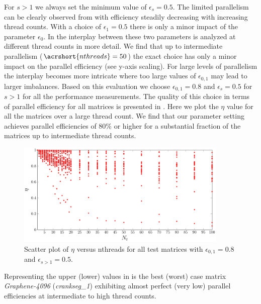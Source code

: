 %
For $s > 1$ we always set the minimum value of $\epsilon_s=0.5$. The limited parallelism can be clearly observed from   with efficiency steadily decreasing with increasing thread counts. With a choice of $\epsilon_1=0.5$ there is only a minor impact of the parameter $\epsilon_0$. In  the interplay between these two parameters is analyzed at different thread counts in more detail. We find that up to intermediate parallelism ($\acrshort{nthreads}=50$) the exact choice has only a minor impact on the parallel efficiency (see y-axis scaling). For large levels of parallelism the interplay becomes more intricate where too large values of $\epsilon_{0,1}$ may lead to larger imbalances. Based on this evaluation we choose $\epsilon_{0,1}=0.8$ and $\epsilon_s=0.5$ for $s>1$ for all the performance measurements. The quality of this choice in terms of parallel efficiency for all matrices is presented in . Here we plot the $\eta$ value for all the matrices over a large thread count. We find that our parameter setting achieves parallel efficiencies of 80\% or higher for a substantial fraction of the matrices up to intermediate thread counts. 
   \begin{figure}[t]
   	\centering
   	\includegraphics[height=0.19\textheight,width=0.9\textwidth]{pics/param_study/scatter_plot}
   	\caption{Scatter plot of $\eta$ versus \acrshort{nthreads} for all test matrices with $\epsilon_{0,1} = 0.8$ and $\epsilon_{s>1} = 0.5$.}
  	\label{fig:param_all_mtx_stat}
   \end{figure}
Representing the upper (lower) values in  is the best (worst) case matrix \emph{Graphene-4096} (\emph{crankseg\_1}) exhibiting almost perfect (very low) parallel efficiencies at intermediate to high thread counts.

